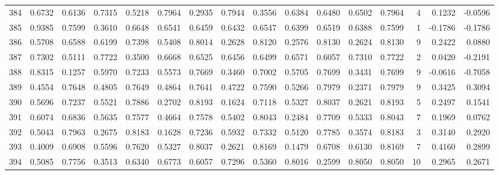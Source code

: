 \begin{tabular}{lrrrrrrrrrrrrrrr}
384 &      0.6732 &  0.6136 &  0.7315 &  0.5218 &  0.7964 &  0.2935 &  0.7944 &  0.3556 &  0.6384 &  0.6480 &   0.6502 &     0.7964 &      4 &                    0.1232 &                    -0.0596 \\
385 &      0.9385 &  0.7599 &  0.3610 &  0.6648 &  0.6541 &  0.6459 &  0.6432 &  0.6547 &  0.6399 &  0.6519 &   0.6388 &     0.7599 &      1 &                   -0.1786 &                    -0.1786 \\
386 &      0.5708 &  0.6588 &  0.6199 &  0.7398 &  0.5408 &  0.8014 &  0.2628 &  0.8120 &  0.2576 &  0.8130 &   0.2624 &     0.8130 &      9 &                    0.2422 &                     0.0880 \\
387 &      0.7302 &  0.5111 &  0.7722 &  0.3500 &  0.6668 &  0.6525 &  0.6456 &  0.6499 &  0.6571 &  0.6057 &   0.7310 &     0.7722 &      2 &                    0.0420 &                    -0.2191 \\
388 &      0.8315 &  0.1257 &  0.5970 &  0.7233 &  0.5573 &  0.7669 &  0.3460 &  0.7002 &  0.5705 &  0.7699 &   0.3431 &     0.7699 &      9 &                   -0.0616 &                    -0.7058 \\
389 &      0.4554 &  0.7648 &  0.4805 &  0.7649 &  0.4864 &  0.7641 &  0.4722 &  0.7590 &  0.5266 &  0.7979 &   0.2371 &     0.7979 &      9 &                    0.3425 &                     0.3094 \\
390 &      0.5696 &  0.7237 &  0.5521 &  0.7886 &  0.2702 &  0.8193 &  0.1624 &  0.7118 &  0.5327 &  0.8037 &   0.2621 &     0.8193 &      5 &                    0.2497 &                     0.1541 \\
391 &      0.6074 &  0.6836 &  0.5635 &  0.7577 &  0.4664 &  0.7578 &  0.5402 &  0.8043 &  0.2484 &  0.7709 &   0.5333 &     0.8043 &      7 &                    0.1969 &                     0.0762 \\
392 &      0.5043 &  0.7963 &  0.2675 &  0.8183 &  0.1628 &  0.7236 &  0.5932 &  0.7332 &  0.5120 &  0.7785 &   0.3574 &     0.8183 &      3 &                    0.3140 &                     0.2920 \\
393 &      0.4009 &  0.6908 &  0.5596 &  0.7620 &  0.5327 &  0.8037 &  0.2621 &  0.8169 &  0.1479 &  0.6708 &   0.6130 &     0.8169 &      7 &                    0.4160 &                     0.2899 \\
394 &      0.5085 &  0.7756 &  0.3513 &  0.6340 &  0.6773 &  0.6057 &  0.7296 &  0.5360 &  0.8016 &  0.2599 &   0.8050 &     0.8050 &     10 &                    0.2965 &                     0.2671 \\

\end{tabular}
